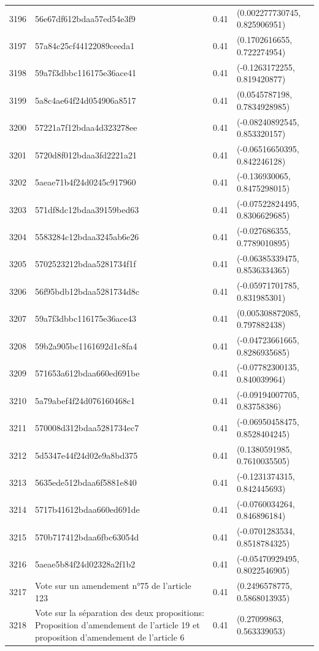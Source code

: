 \begin{table}[ht]
\begin{tabular}{rlrl}
  3196 & 56e67df612bdaa57ed54e3f9 & 0.41 & (0.002277730745, 0.825906951) \\ 
  3197 & 57a84c25cf44122089ceeda1 & 0.41 & (0.1702616655, 0.722274954) \\ 
  3198 & 59a7f3dbbc116175e36ace41 & 0.41 & (-0.1263172255, 0.819420877) \\ 
  3199 & 5a8c4ae64f24d054906a8517 & 0.41 & (0.0545787198, 0.7834928985) \\ 
  3200 & 57221a7f12bdaa4d323278ee & 0.41 & (-0.08240892545, 0.853320157) \\ 
  3201 & 5720d8f012bdaa3fd2221a21 & 0.41 & (-0.06516650395, 0.842246128) \\ 
  3202 & 5aeae71b4f24d0245c917960 & 0.41 & (-0.136930065, 0.8475298015) \\ 
  3203 & 571df8dc12bdaa39159bed63 & 0.41 & (-0.07522824495, 0.8306629685) \\ 
  3204 & 5583284c12bdaa3245ab6e26 & 0.41 & (-0.027686355, 0.7789010895) \\ 
  3205 & 5702523212bdaa5281734f1f & 0.41 & (-0.06385339475, 0.8536334365) \\ 
  3206 & 56f95bdb12bdaa5281734d8c & 0.41 & (-0.05971701785, 0.831985301) \\ 
  3207 & 59a7f3dbbc116175e36ace43 & 0.41 & (0.005308872085, 0.797882438) \\ 
  3208 & 59b2a905bc1161692d1c8fa4 & 0.41 & (-0.04723661665, 0.8286935685) \\ 
  3209 & 571653a612bdaa660ed691be & 0.41 & (-0.07782300135, 0.840039964) \\ 
  3210 & 5a79abef4f24d076160468c1 & 0.41 & (-0.09194007705, 0.83758386) \\ 
  3211 & 570008d312bdaa5281734ec7 & 0.41 & (-0.06950458475, 0.8528404245) \\ 
  3212 & 5d5347e44f24d02e9a8bd375 & 0.41 & (0.1380591985, 0.7610035505) \\ 
  3213 & 5635ede512bdaa6f5881e840 & 0.41 & (-0.1231374315, 0.842445693) \\ 
  3214 & 5717b41612bdaa660ed691de & 0.41 & (-0.0760034264, 0.846896184) \\ 
  3215 & 570b717412bdaa6fbc63054d & 0.41 & (-0.0701283534, 0.8518784325) \\ 
  3216 & 5aeae5b84f24d02328a2f1b2 & 0.41 & (-0.05470929495, 0.8022546905) \\ 
  3217 & Vote sur un amendement n°75 de l'article 123 & 0.41 & (0.2496578775, 0.5868013935) \\ 
  3218 & Vote sur la séparation des deux propositions: Proposition d'amendement de l'article 19 et proposition d'amendement de l'article 6 & 0.41 & (0.27099863, 0.563339053) \\ 

\end{tabular}
\end{table}
